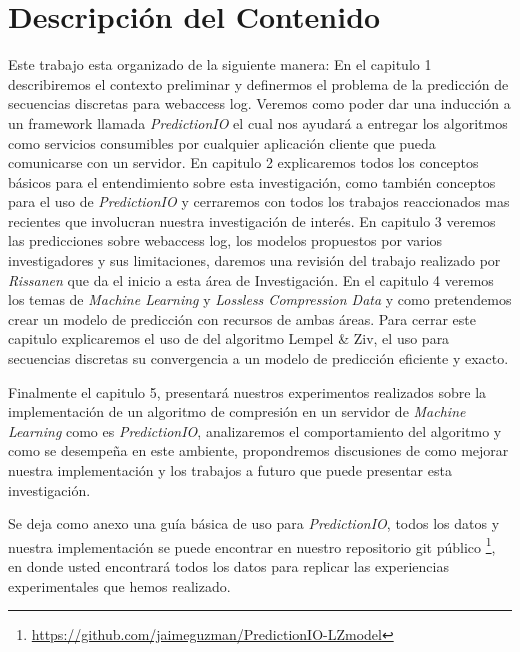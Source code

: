 \section{Descripción del Contenido}

Este trabajo esta organizado de la siguiente manera: En el capitulo 1 describiremos el contexto preliminar y definermos el problema de la predicción de secuencias discretas para webaccess log. Veremos como poder dar una inducción a un framework llamada \emph{PredictionIO} el cual nos ayudará a entregar los algoritmos como servicios consumibles por cualquier aplicación cliente que pueda comunicarse con un servidor.
En capitulo 2 explicaremos todos los conceptos básicos para el entendimiento sobre esta investigación, como también conceptos para el uso de \emph{PredictionIO} y cerraremos con todos los trabajos  reaccionados mas recientes que involucran nuestra investigación de interés. En capitulo 3 veremos las predicciones sobre webaccess log, los modelos propuestos por varios investigadores y sus limitaciones, daremos una revisión del trabajo realizado por \emph{Rissanen}\cite{Rissanen1984} que da el inicio a esta área de Investigación.
En el capitulo 4 veremos los temas de \emph{Machine Learning} y \emph{Lossless Compression Data} y como pretendemos crear un modelo de predicción con recursos de ambas áreas. Para cerrar este capitulo explicaremos el uso de del algoritmo Lempel \& Ziv, el uso para secuencias discretas su convergencia a un modelo de predicción eficiente y exacto. 

Finalmente el capitulo 5, presentará nuestros experimentos realizados sobre la implementación de un algoritmo de compresión en un servidor de \emph{Machine Learning} como es \emph{PredictionIO}, analizaremos el comportamiento del algoritmo y como se desempeña en este ambiente, propondremos discusiones de como mejorar nuestra implementación y los trabajos a futuro que puede presentar esta investigación.

Se deja como anexo una guía básica de uso para \emph{PredictionIO}, todos los datos y nuestra implementación se puede encontrar en nuestro repositorio git público \footnote{\url{https://github.com/jaimeguzman/PredictionIO-LZmodel}}, en donde usted encontrará todos los datos para replicar las experiencias experimentales que hemos realizado. 

